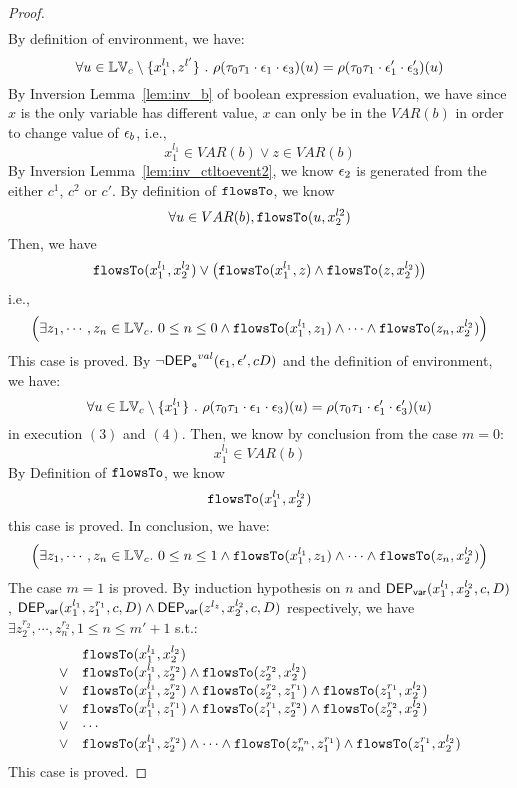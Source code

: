 {\begin{proof}
\[\begin{array}{l}
\end{array}
 \]
 By definition of environment, we have:
\[
  \forall u \in \mathbb{LV}_c \setminus \{x_1^{l_1}, z^{l'}\} ~.~
  \rho(\mathtt{\tau}_0 \mathtt{\tau}_1 \cdot \mathtt{\epsilon}_1 \cdot \mathtt{\epsilon}_3 ) (u) =  
  \rho(\mathtt{\tau}_0 \mathtt{\tau}_1 \cdot \mathtt{\epsilon}_1' \cdot \mathtt{\epsilon}_3') (u)
\]
%
By {Inversion Lemma~\ref{lem:inv_b}} of boolean expression evaluation, we have since $x$ is the only variable has different value, $x$ can only be in the $VAR(b)$ in order to change value of $\mathtt{\epsilon}_b$, i.e.,
 \[
  x_1^{l_1} \in VAR(b) \lor z \in VAR(b)
 \]
 By {Inversion Lemma~\ref{lem:inv_ctltoevent2}}, we know $\mathtt{\epsilon}_2$ is generated from the either $c^1$, $c^2$ or $c'$.
 By definition of $\mathtt{flowsTo}$, we know
 \[
 \forall u \in VAR(b), \mathtt{flowsTo}(u, x_2^{l2})
 \]
 Then, we have
 \[
  \mathtt{flowsTo}(x_1^{l_1}, x_2^{l_2}) \lor 
  \big(\mathtt{flowsTo}(x_1^{l_1}, z) \land \mathtt{flowsTo}(z, x_2^{l_2}) \big)
 \]
 i.e.,
 \[
 \Big( \exists z_1, \cdots, z_n \in \mathbb{LV}_{{c}}. ~ 0 \leq n \leq 0 \land
  \mathtt{flowsTo}(x_1^{l_1}, z_1) 
  \land \cdots \land \mathtt{flowsTo}(z_n, x_2^{l_2}) \Big)
 \]
 This case is proved.
%
%
By $\neg \mathsf{DEP_{\mathtt{e}}}^{val}(\mathtt{\epsilon}_1, \mathtt{\epsilon}', c D)$ and the definition of environment, we have:
\[
  \forall u \in \mathbb{LV}_c \setminus \{x_1^{l_1}\} ~.~
  \rho(\mathtt{\tau}_0 \mathtt{\tau}_1 \cdot \mathtt{\epsilon}_1 \cdot \mathtt{\epsilon}_3 ) (u) =  
  \rho(\mathtt{\tau}_0 \mathtt{\tau}_1 \cdot \mathtt{\epsilon}_1' \cdot \mathtt{\epsilon}_3') (u)
\]
in execution $(3)$ and $(4)$.
%
Then, we know by conclusion from the case $m = 0$:
\[
  x_1^{l_1} \in VAR(b)
\]
%
By Definition of $\mathtt{flowsTo}$, we know
\[
  \mathtt{flowsTo}(x_1^{l_1}, x_2^{l_2}) 
\]
this case is proved.
%
In conclusion, we have:
\[
  \Big( \exists z_1, \cdots, z_n \in \mathbb{LV}_{{c}}. ~ 0 \leq n \leq 1 \land
  \mathtt{flowsTo}(x_1^{l_1}, z_1) 
  \land \cdots \land \mathtt{flowsTo}(z_n, x_2^{l_2}) \Big)
\]
The case $m = 1$ is proved.
%
By induction hypothesis on $n$ and $\mathsf{DEP_{var}}(x_1^{l_1}, x_2^{l_2}, c, D)$, 
$\mathsf{DEP_{var}}(x_1^{l_1}, z_1^{r_1}, c, D) \land \mathsf{DEP_{var}}(z^{l_z}, x_2^{l_2}, c, D)$ respectively, 
we have $\exists z_2^{r_2}, \cdots, z_n^{r_2}, 1 \leq n \leq m'+1$ s.t.:
\[
\begin{array}{ll}
      & \mathtt{flowsTo}(x_1^{l_1}, x_2^{l_2}) \\
  \lor  & \mathtt{flowsTo}(x_1^{l_1}, z_2^{r_2}) \land \mathtt{flowsTo}(z_2^{r_2}, x_2^{l_2})\\
  \lor  & \mathtt{flowsTo}(x_1^{l_1}, z_2^{r_2}) \land \mathtt{flowsTo}(z_2^{r_2}, z_1^{r_1}) \land \mathtt{flowsTo}(z_1^{r_1}, x_2^{l_2}) \\
  \lor  & \mathtt{flowsTo}(x_1^{l_1}, z_1^{r_1}) \land \mathtt{flowsTo}(z_1^{r_1}, z_2^{r_2}) \land \mathtt{flowsTo}(z_2^{r_2}, x_2^{l_2}) \\
  \lor  & \cdots \\
  \lor  & \mathtt{flowsTo}(x_1^{l_1}, z_2^{r_2}) \land \cdots \land \mathtt{flowsTo}(z_n^{r_n}, z_1^{r_1}) \land \mathtt{flowsTo}(z_1^{r_1}, x_2^{l_2}) \\
\end{array}
\]This case is proved.
\end{proof}}